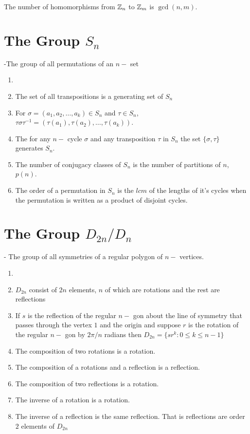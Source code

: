 \begin{theorem}
	The number of homomorphisms from $\mathbb{Z}_n$ to $\mathbb{Z}_m$ is $\gcd(n,m)$.	
\end{theorem}

\section{The Group $S_n$}
-The group of all permutations of an $n-$ set
\begin{theorem}[Properties of $S_n$]
	\begin{enumerate}
		\item[]
		\item 
		The set of all transpositions is a generating set of $S_n$
		\item 
		For $\sigma=(a_1,a_2,\dots,a_k)\in S_n$ and $\tau\in S_n$, $\tau\sigma\tau^{-1}=(\tau(a_1),\tau(a_2),\dots,\tau(a_k))$.
		\item 
		The for any $n-$ cycle $\sigma$ and any transposition $\tau$ in $S_n$ the set $\{\sigma,\tau\}$ generates $S_n$.  
		\item 
		The number of conjugacy classes of $S_n$ is the number of partitions of $n$, $p(n)$. 
		\item 
		The order of a permutation in $S_n$ is the $lcm$ of the lengths of it's cycles when the permutation is written as a product of disjoint cycles. 
	\end{enumerate}
\end{theorem}

\section{The Group $D_{2n}/D_n$}
- The group of all symmetries of a regular polygon of $n-$ vertices.
\begin{theorem}[Properties of $D_n$]
	\begin{enumerate}
		\item[]
		\item 
		$D_{2n}$ consist of $2n$ elements, $n$ of which are rotations and the rest are reflections
		\item 
		If $s$ is the reflection of the regular $n-$ gon about the line of symmetry that passes through the vertex $1$ and the origin and suppose $r$ is the rotation of the regular $n-$ gon by $2\pi/n$ radians then $D_{2n}=\{sr^k:0\leq k\leq n-1\}$
		\item 
		The composition of two rotations is a rotation.
		\item 
		The composition of a rotations and a reflection is a reflection.
		\item 
		The composition of two reflections is a rotation.
		\item 
		The inverse of a rotation is a rotation.
		\item 
		The inverse of a reflection is the same reflection. That is reflections are order $2$ elements of $D_{2n}$
	\end{enumerate}
\end{theorem}



